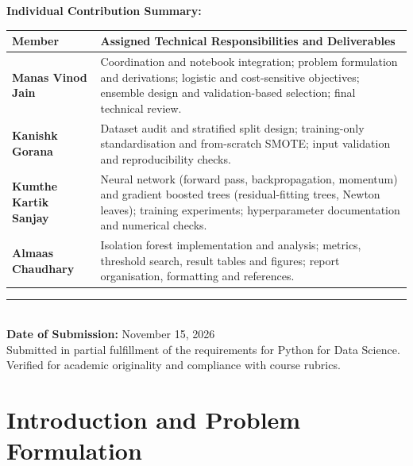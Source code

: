 \documentclass[11pt,a4paper]{article}
\begin{document}
\begin{titlepage}
    \vspace{0.8cm}
    
    {\large \textbf{Individual Contribution Summary:}}\\[0.3cm]
    \begin{tabularx}{0.96\linewidth}{lX}
        \toprule
        \textbf{Member} & \textbf{Assigned Technical Responsibilities and Deliverables} \\
        \midrule
        \textbf{Manas Vinod Jain} & Coordination and notebook integration; problem formulation and derivations; logistic and cost-sensitive objectives; ensemble design and validation-based selection; final technical review. \\
        \addlinespace
        \textbf{Kanishk Gorana} & Dataset audit and stratified split design; training-only standardisation and from-scratch SMOTE; input validation and reproducibility checks. \\
        \addlinespace
        \textbf{Kumthe Kartik Sanjay} & Neural network (forward pass, backpropagation, momentum) and gradient boosted trees (residual-fitting trees, Newton leaves); training experiments; hyperparameter documentation and numerical checks. \\
        \addlinespace
        \textbf{Almaas Chaudhary} & Isolation forest implementation and analysis; metrics, threshold search, result tables and figures; report organisation, formatting and references. \\
        \bottomrule
    \end{tabularx}
    
    \vfill
    \rule{\linewidth}{0.4mm}\\[0.25cm]
    {\large \textbf{Date of Submission:} November 15, 2026}\\[0.15cm]
    {\small Submitted in partial fulfillment of the requirements for Python for Data Science.}\\[0.1cm]
    {\footnotesize Verified for academic originality and compliance with course rubrics.}
    
\end{titlepage}

\newpage
\tableofcontents
\newpage

\section{Introduction and Problem Formulation}
\label{sec:introduction}
\end{document}
